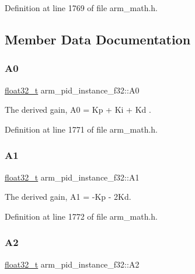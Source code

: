 Definition at line 1769 of file arm\+\_\+math.\+h.



\subsection{Member Data Documentation}
\mbox{\label{structarm__pid__instance__f32_ad7b0bed64915d0a25a3409fa2dc45556}} 
\subsubsection{\texorpdfstring{A0}{A0}}
{\footnotesize\ttfamily \hyperlink{arm__math_8h_a4611b605e45ab401f02cab15c5e38715}{float32\+\_\+t} arm\+\_\+pid\+\_\+instance\+\_\+f32\+::\+A0}

The derived gain, A0 = Kp + Ki + Kd . 

Definition at line 1771 of file arm\+\_\+math.\+h.

\mbox{\label{structarm__pid__instance__f32_a7def89571c50f7137a213326a396e560}} 
\subsubsection{\texorpdfstring{A1}{A1}}
{\footnotesize\ttfamily \hyperlink{arm__math_8h_a4611b605e45ab401f02cab15c5e38715}{float32\+\_\+t} arm\+\_\+pid\+\_\+instance\+\_\+f32\+::\+A1}

The derived gain, A1 = -\/\+Kp -\/ 2\+Kd. 

Definition at line 1772 of file arm\+\_\+math.\+h.

\mbox{\label{structarm__pid__instance__f32_a155acf642ba2f521869f19d694cd7fa0}} 
\subsubsection{\texorpdfstring{A2}{A2}}
{\footnotesize\ttfamily \hyperlink{arm__math_8h_a4611b605e45ab401f02cab15c5e38715}{float32\+\_\+t} arm\+\_\+pid\+\_\+instance\+\_\+f32\+::\+A2}

